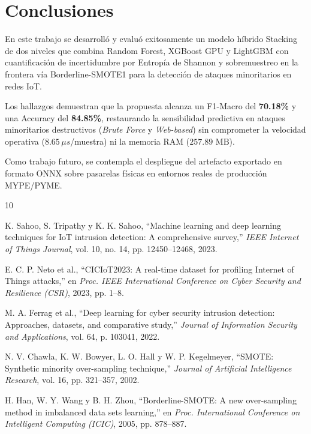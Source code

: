 \documentclass[conference]{IEEEtran}
\begin{document}
\section{Conclusiones}
En este trabajo se desarrolló y evaluó exitosamente un modelo híbrido Stacking de dos niveles que combina Random Forest, XGBoost GPU y LightGBM con cuantificación de incertidumbre por Entropía de Shannon y sobremuestreo en la frontera vía Borderline-SMOTE1 para la detección de ataques minoritarios en redes IoT.

Los hallazgos demuestran que la propuesta alcanza un F1-Macro del \textbf{70.18\%} y una Accuracy del \textbf{84.85\%}, restaurando la sensibilidad predictiva en ataques minoritarios destructivos (\textit{Brute Force} y \textit{Web-based}) sin comprometer la velocidad operativa ($8.65\,\mu s$/muestra) ni la memoria RAM ($257.89\text{ MB}$).

Como trabajo futuro, se contempla el despliegue del artefacto exportado en formato ONNX sobre pasarelas físicas en entornos reales de producción MYPE/PYME.


\begin{thebibliography}{10}

K. Sahoo, S. Tripathy y K. K. Sahoo, ``Machine learning and deep learning techniques for IoT intrusion detection: A comprehensive survey,'' \emph{IEEE Internet of Things Journal}, vol. 10, no. 14, pp. 12450--12468, 2023.

E. C. P. Neto et al., ``CICIoT2023: A real-time dataset for profiling Internet of Things attacks,'' en \emph{Proc. IEEE International Conference on Cyber Security and Resilience (CSR)}, 2023, pp. 1--8.

M. A. Ferrag et al., ``Deep learning for cyber security intrusion detection: Approaches, datasets, and comparative study,'' \emph{Journal of Information Security and Applications}, vol. 64, p. 103041, 2022.

N. V. Chawla, K. W. Bowyer, L. O. Hall y W. P. Kegelmeyer, ``SMOTE: Synthetic minority over-sampling technique,'' \emph{Journal of Artificial Intelligence Research}, vol. 16, pp. 321--357, 2002.

H. Han, W. Y. Wang y B. H. Zhou, ``Borderline-SMOTE: A new over-sampling method in imbalanced data sets learning,'' en \emph{Proc. International Conference on Intelligent Computing (ICIC)}, 2005, pp. 878--887.

\end{thebibliography}
\end{document}
